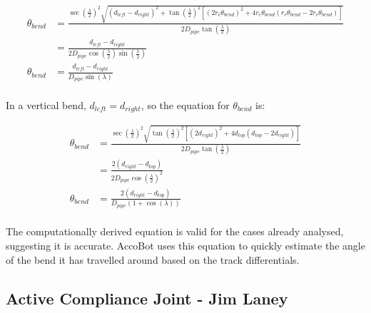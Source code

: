 \documentclass[11pt]{article}		%
\begin{document}
			\begin{align*}
				\theta_{bend} &= \frac{ \sec \left( \frac{\lambda}{2} \right)^2 \sqrt{ \left( d_{left} - d_{right} \right)^2 +  \tan \left( \frac{\lambda}{2} \right)^2 \left[ \left( 2 r_c \theta_{bend} \right)^2 + 4 r_c \theta_{bend} \left( r_c \theta_{bend}  - 2 r_c \theta_{bend} \right) \right] } }{2 D_{pipe} \tan \left( \frac{\lambda}{2} \right)}
				\\
				&= \frac{d_{left} - d_{right}}{2 D_{pipe} \cos \left( \frac{\lambda}{2} \right) \sin \left( \frac{\lambda}{2} \right)}
				\\
				\theta_{bend} &= \frac{d_{left} - d_{right}}{D_{pipe} \sin \left( \lambda \right)}
			\end{align*}
			\\
	        \hspace*{3ex}In a vertical bend, $d_{left} = d_{right}$, so the equation for $\theta_{bend}$ is:
			
			\begin{align*}
				\theta_{bend} &= \frac{ \sec \left( \frac{\lambda}{2} \right)^2 \sqrt{ \tan \left( \frac{\lambda}{2} \right)^2 \left[ \left( 2 d_{right} \right)^2 + 4 d_{top} \left( d_{top} - 2 d_{right} \right) \right] } }{2 D_{pipe} \tan \left( \frac{\lambda}{2} \right)}
				\\
				&= \frac{2 \left( d_{right} - d_{top} \right)}{2 D_{pipe} \cos \left( \frac{\lambda}{2} \right)^2}
				\\
				\theta_{bend} &= \frac{2 \left( d_{right} - d_{top} \right)}{D_{pipe} \left( 1 + \cos \left( \lambda \right) \right)}
			\end{align*}
			\\
	        \hspace*{3ex}The computationally derived equation is valid for the cases already analysed, suggesting it is accurate.
			AccoBot uses this equation to quickly estimate the angle of the bend it has travelled around based on the track differentials.
		 		
		\subsection[Active Compliance Joint]{Active Compliance Joint - Jim Laney} \label{complianceControl}
		
\end{document}
